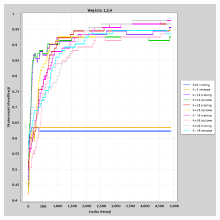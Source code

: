 \documentclass[a4paper, portrait,11pt]{article}
\begin{document}
\begin{figure}[!htb]
\begin{minipage}{0.33\textwidth}
    \caption{\label{fig:41_3_1,2,3}}
  \end{minipage}
  \begin{minipage}{0.33\textwidth}
    \centering
    \includegraphics[width=1\linewidth]{../data/classification4/1/3_1,2,4.png}
    \caption{\label{fig:41_3_1,2,4}}
  \end{minipage}\hfill
\end{figure}
\end{document}
